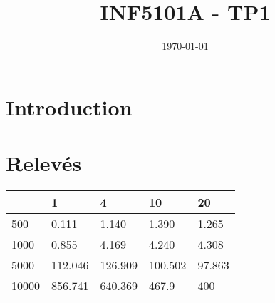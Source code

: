 \documentclass[a4paper,tikz]{article}
\title{INF5101A - TP1}
\date{\today}
\begin{document}
\maketitle
\newpage
\tableofcontents
\newpage

\section{Introduction}

\section{Relevés}

\begin{tabular}{|l|l|l|l|l|}
	\hline
	& 1 & 4 & 10 & 20 \\ \hline
	500 & 0.111 & 1.140 & 1.390 & 1.265 \\ \hline
	1000 & 0.855 & 4.169 & 4.240 & 4.308 \\ \hline
	5000 & 112.046 & 126.909 & 100.502 & 97.863 \\ \hline
	10000 & 856.741 & 640.369 & 467.9 & 400 \\ \hline

\end{tabular}
\end{document}
